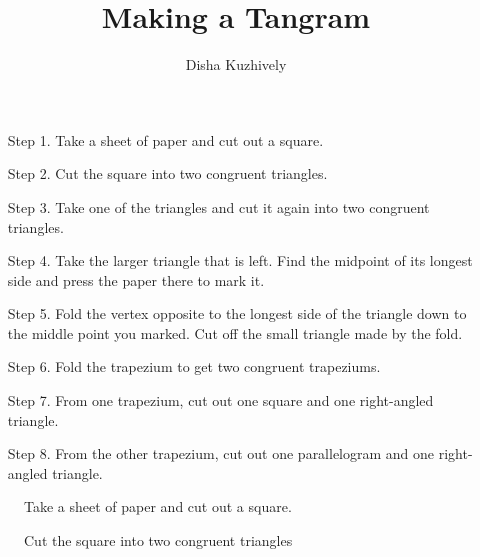 \documentclass[a4paper]{article}
\title{Making a Tangram}
\author{Disha Kuzhively}
\date{}
\begin{document}
\maketitle
\begin{enumerate}
    \item[Step 1.] Take a sheet of paper and cut out a square.
    \item[Step 2.] Cut the square into two congruent triangles.
    \item[Step 3.] Take one of the triangles and cut it again into two congruent triangles.
    \item[Step 4.] Take the larger triangle that is left. Find the midpoint of its longest side and press the paper there to mark it.
    \item[Step 5.] Fold the vertex opposite to the longest side of the triangle down to the middle point you marked. Cut off the small triangle made by the fold.
    \item[Step 6.] Fold the trapezium to get two congruent trapeziums.
    \item[Step 7.] From one trapezium, cut out one square and one right-angled triangle.
    \item[Step 8.] From the other trapezium, cut out one parallelogram and one right-angled triangle.
\end{enumerate}
\newpage
\twocolumn
\begin{figure}
    \centering
    \caption{Take a sheet of paper and cut out a square.}
\end{figure}
\begin{figure}
    \centering
    \caption{Cut the square into two congruent triangles}
\end{figure}
\end{document}
